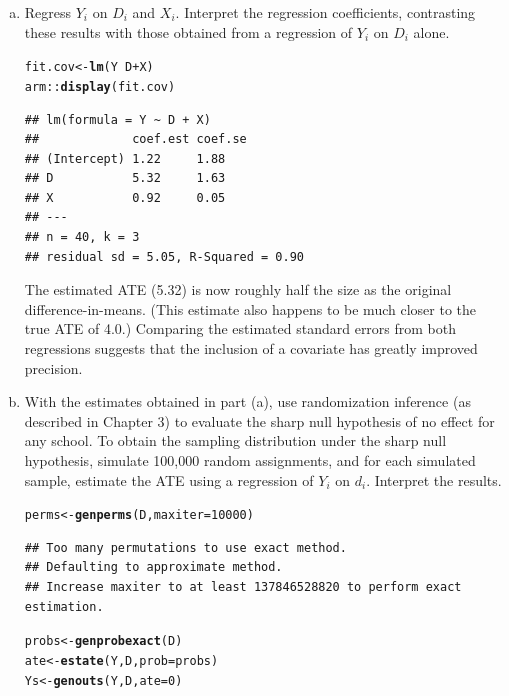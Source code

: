 \documentclass[11pt,notitlepage]{article}\usepackage[]{graphicx}\usepackage[]{color}
\makeatletter
\newcommand{\hlnum}[1]{\textcolor[rgb]{0.686,0.059,0.569}{#1}}%
\newcommand{\hlopt}[1]{\textcolor[rgb]{0,0,0}{#1}}%
\newcommand{\hlstd}[1]{\textcolor[rgb]{0.345,0.345,0.345}{#1}}%
\newcommand{\hlkwb}[1]{\textcolor[rgb]{0.69,0.353,0.396}{#1}}%
\newcommand{\hlkwc}[1]{\textcolor[rgb]{0.333,0.667,0.333}{#1}}%
\newcommand{\hlkwd}[1]{\textcolor[rgb]{0.737,0.353,0.396}{\textbf{#1}}}%
\newenvironment{kframe}{%
 \def\at@end@of@kframe{}%
 \ifinner\ifhmode%
  \def\at@end@of@kframe{\end{minipage}}%
  \begin{minipage}{\columnwidth}%
 \fi\fi%
 \def\FrameCommand##1{\hskip\@totalleftmargin \hskip-\fboxsep
 \colorbox{shadecolor}{##1}\hskip-\fboxsep
     \hskip-\linewidth \hskip-\@totalleftmargin \hskip\columnwidth}%
 \MakeFramed {\advance\hsize-\width
   \@totalleftmargin\z@ \linewidth\hsize
   \@setminipage}}%
 {\par\unskip\endMakeFramed%
 \at@end@of@kframe}
\newenvironment{knitrout}{}{} %
\makeatother
\begin{document}
\begin{enumerate}[a)]
\item   Regress $Y_i$ on $D_i$ and $X_i$. Interpret the regression coefficients, contrasting these results with those obtained from a regression of $Y_i$ on $D_i$ alone.

\begin{knitrout}
\color{fgcolor}\begin{kframe}
\begin{alltt}
\hlstd{fit.cov} \hlkwb{<-} \hlkwd{lm}\hlstd{(Y}\hlopt{~}\hlstd{D}\hlopt{+}\hlstd{X)}
\hlstd{arm::}\hlkwd{display}\hlstd{(fit.cov)}
\end{alltt}
\begin{verbatim}
## lm(formula = Y ~ D + X)
##             coef.est coef.se
## (Intercept) 1.22     1.88   
## D           5.32     1.63   
## X           0.92     0.05   
## ---
## n = 40, k = 3
## residual sd = 5.05, R-Squared = 0.90
\end{verbatim}
\end{kframe}
\end{knitrout}

The estimated ATE (5.32) is now roughly half the size as the original difference-in-means.  (This estimate also happens to be much closer to the true ATE of 4.0.) Comparing the estimated standard errors from both regressions suggests that the inclusion of a covariate has greatly improved precision.

\item With the estimates obtained in part (a), use randomization inference (as described in Chapter 3) to evaluate the sharp null hypothesis of no effect for any school. To obtain the sampling distribution under the sharp null hypothesis, simulate 100,000 random assignments, and for each simulated sample, estimate the ATE using a regression of $Y_i$ on $d_i$. Interpret the results.  

\begin{knitrout}
\color{fgcolor}\begin{kframe}
\begin{alltt}
\hlstd{perms} \hlkwb{<-} \hlkwd{genperms}\hlstd{(D,}\hlkwc{maxiter}\hlstd{=}\hlnum{10000}\hlstd{)}
\end{alltt}
\begin{verbatim}
## Too many permutations to use exact method.
## Defaulting to approximate method.
## Increase maxiter to at least 137846528820 to perform exact estimation.
\end{verbatim}
\begin{alltt}
\hlstd{probs} \hlkwb{<-} \hlkwd{genprobexact}\hlstd{(D)}
\hlstd{ate} \hlkwb{<-} \hlkwd{estate}\hlstd{(Y,D,}\hlkwc{prob}\hlstd{=probs)}
\hlstd{Ys} \hlkwb{<-} \hlkwd{genouts}\hlstd{(Y,D,}\hlkwc{ate}\hlstd{=}\hlnum{0}\hlstd{)}


\end{alltt}
\end{kframe}
\end{knitrout}
\end{enumerate}
\end{document}
